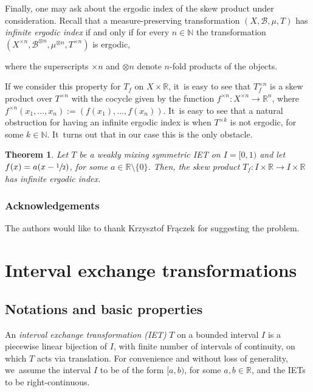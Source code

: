 \documentclass[JEP,XML,SOM,Unicode,NoEqCountersInSection,NoFloatCountersInSection,published]{cedram}
\theoremstyle{plain}
\newtheorem{theorem}{Theorem}[section]
\theoremstyle{definition}
\newcommand{\N}{\mathbb{N}}
\newcommand{\R}{\mathbb{R}}
\begin{document}
Finally, one may ask about the ergodic index of the skew product under consideration. Recall that a measure-preserving transformation $(X,\mathcal B,\mu,T)$ has \emph{infinite ergodic index} if and only if for every $n\in\N$ the transformation $(X^{\times n},\mathcal B^{\otimes n}, \mu^{\otimes n},T^{\times n})$ is ergodic, {where the superscripts $\times n$ and $\otimes n$ denote $n$-fold products of the objects.

If we consider this property for $T_f$ on $X\times \R$, it~is easy to see that $T_f^{\times n}$ is a skew product over $T^{\times n}$ with the cocycle given by the function $f^{\times n}:X^{\times n}\to \R^n$, where $f^{\times n}(x_1,\ldots,x_n):=(f(x_1),\ldots,f(x_n))$. It~is easy to see that a natural obstruction for having an infinite ergodic index is when $T^{\times k}$ is not ergodic, for some $k\in\N$. It~turns out that in our case this is the only obstacle.

\begin{theorem}\label{thm: index}
Let $T$ be a weakly mixing
symmetric IET on $I = [0, 1)$ and let $f(x)=a(x-\sfrac{1}{2})$, for some $a\in\R\setminus\{0\}$. Then, the skew product $T_f:I\times\R\to I\times \R$ has infinite ergodic index.
\end{theorem}

\subsubsection*{Acknowledgements}
The authors would like to thank Krzysztof Frączek for suggesting the problem.

\section{Interval exchange transformations}
\label{sc:IETs}

\subsection{Notations and basic properties} An \emph{interval exchange transformation (IET)} $T$ on a bounded interval $I$ is a piecewise linear bijection of $I$, with finite number of intervals of continuity, on which $T$ acts via translation. {For convenience and without loss of generality, we~assume the interval $I$ to be of the form $[a, b)$, for some $a, b \in \R$, and the IETs to be right-continuous.}

}
\end{document}
